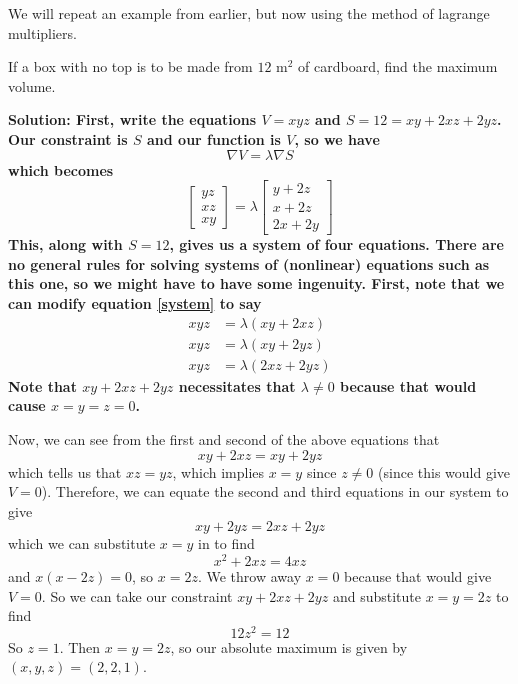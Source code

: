 \begin{example}
    We will repeat an example from earlier, but now using the method of lagrange multipliers.\par If a box with no top is to be made from \(12\) \( \unit{\meter^2} \) of cardboard, find the maximum volume.\par\bf{Solution: }First, write the equations \(V = xyz\) and \(S = 12=xy+2xz+2yz\). Our constraint is \(S\) and our function is \(V\), so we have
    \[ \nabla V = \lambda \nabla S\]
    which becomes
    \begin{equation}\label{system} \begin{bmatrix}
        yz \\ xz \\ xy
    \end{bmatrix} = \lambda \begin{bmatrix}
        y + 2z \\ x + 2z \\ 2x + 2y
    \end{bmatrix}\end{equation}
    This, along with \(S=12\), gives us a system of four equations. There are no general rules for solving systems of (nonlinear) equations such as this one, so we might have to have some ingenuity. First, note that we can modify equation \ref{system} to say
    \begin{align*}
        xyz &= \lambda (xy + 2xz) \\
        xyz &= \lambda (xy+ 2yz) \\
        xyz &= \lambda(2xz+2yz)
    \end{align*}
    Note that \(xy+2xz+2yz\) necessitates that \(\lambda \neq 0\) because that would cause \(x=y=z=0\). \par
    Now, we can see from the first and second of the above equations that
    \[ xy+2xz = xy+2yz\]
    which tells us that \(xz=yz\), which implies \(x=y\) since \(z\neq 0\) (since this would give \(V=0\)). Therefore, we can equate the second and third equations in our system to give
    \[ xy+2yz = 2xz+2yz\]
    which we can substitute \(x=y\) in to find
    \[ x^2+2xz = 4xz \]
    and \(x(x-2z)=0\), so \(x=2z\). We throw away \(x=0\) because that would give \(V=0\). So we can take our constraint \(xy+2xz+2yz\) and substitute \(x=y=2z\) to find
    \[ 12z^2=12\]
    So \(z=1\). Then \(x=y=2z\), so our absolute maximum is given by \((x,y,z) = (2,2,1)\).
\end{example}
